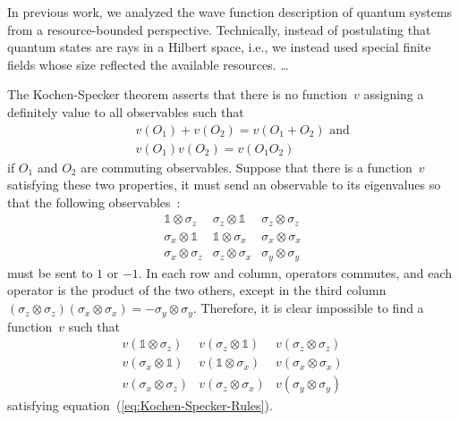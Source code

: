 \documentclass[reprint, aps, prl,superscriptaddress, showpacs,
showkeys]{revtex4-1}
\theoremstyle{plain}
\theoremstyle{definition}
\begin{document}
In previous work, we analyzed the wave function description of quantum
systems from a resource-bounded perspective. Technically, instead of
postulating that quantum states are rays in a Hilbert space, i.e., we
instead used special finite fields whose size reflected the available
resources. \ldots

\newpage

The
Kochen-Specker theorem asserts that there is no function~$v$ assigning
a definitely value to all observables such that
\begin{eqnarray}
& & v\left(O_{1}\right)+v\left(O_{2}\right)=v\left(O_{1}+O_{2}\right)\textrm{ and}\\
& & v\left(O_{1}\right)v\left(O_{2}\right)=v\left(O_{1}O_{2}\right)
\label{eq:Kochen-Specker-Rules}\end{eqnarray}
if $O_{1}$ and $O_{2}$ are commuting observables. Suppose that there
is a function~$v$ satisfying these two properties, it must send
an observable to its eigenvalues so that the following observables~\cite{Mermin1990Simple,peres1995quantum}:
\begin{equation}
\begin{array}{ccc}
\mathbb{1}\otimes\sigma_{z} & \sigma_{z}\otimes\mathbb{1} & \sigma_{z}\otimes\sigma_{z}\\
\sigma_{x}\otimes\mathbb{1} & \mathbb{1}\otimes\sigma_{x} & \sigma_{x}\otimes\sigma_{x}\\
\sigma_{x}\otimes\sigma_{z} & \sigma_{z}\otimes\sigma_{x} & \sigma_{y}\otimes\sigma_{y}
\end{array}\label{eq:MerminSquare}
\end{equation}
must be sent to $1$ or $-1$. In each row and column, operators commutes,
and each operator is the product of the two others, except in the
third column $\left(\sigma_{z}\otimes\sigma_{z}\right)\left(\sigma_{x}\otimes\sigma_{x}\right)=-\sigma_{y}\otimes\sigma_{y}$.
Therefore, it is clear impossible to find a function~$v$ such that
\begin{equation}
\begin{array}{ccc}
v\left(\mathbb{1}\otimes\sigma_{z}\right) & v\left(\sigma_{z}\otimes\mathbb{1}\right) & v\left(\sigma_{z}\otimes\sigma_{z}\right)\\
v\left(\sigma_{x}\otimes\mathbb{1}\right) & v\left(\mathbb{1}\otimes\sigma_{x}\right) & v\left(\sigma_{x}\otimes\sigma_{x}\right)\\
v\left(\sigma_{x}\otimes\sigma_{z}\right) & v\left(\sigma_{z}\otimes\sigma_{x}\right) & v\left(\sigma_{y}\otimes\sigma_{y}\right)
\end{array}\label{eq:MerminSquare-values}
\end{equation}
satisfying equation~(\ref{eq:Kochen-Specker-Rules}).
\end{document}
